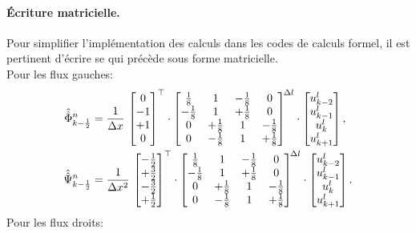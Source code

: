 \paragraph{Écriture matricielle.}
Pour simplifier l'implémentation des calculs dans les codes de calculs formel, il est pertinent d'écrire se qui précède sous forme matricielle.\\
Pour les flux gauches:
\begin{align}
\hat{\hat{\Phi}}_{k-\frac12}^n
&= \frac{1}{\Delta x}\,
\begin{bmatrix}0 \\ -1 \\ +1 \\ 0\end{bmatrix}^\top \cdot
\begin{bmatrix}
\frac{1}{8} & 1 & -\frac{1}{8} & 0\\
-\frac{1}{8} & 1 & +\frac{1}{8} & 0\\
0 & +\frac{1}{8} & 1 & -\frac{1}{8}\\
0 & -\frac{1}{8} & 1 & +\frac{1}{8}
\end{bmatrix}^{\!\Delta l} \cdot
\begin{bmatrix}
u^l_{k-2}\\ u^l_{k-1}\\ u^l_{k}\\ u^l_{k+1}
\end{bmatrix},\\
\hat{\hat{\Psi}}_{k-\frac12}^n
&= \frac{1}{\Delta x^2}\,
\begin{bmatrix}-\tfrac12 \\ +\tfrac32 \\ -\tfrac32 \\ +\tfrac12\end{bmatrix}^\top \cdot
\begin{bmatrix}
\frac{1}{8} & 1 & -\frac{1}{8} & 0\\
-\frac{1}{8} & 1 & +\frac{1}{8} & 0\\
0 & +\frac{1}{8} & 1 & -\frac{1}{8}\\
0 & -\frac{1}{8} & 1 & +\frac{1}{8}
\end{bmatrix}^{\!\Delta l} \cdot
\begin{bmatrix}
u^l_{k-2}\\ u^l_{k-1}\\ u^l_{k}\\ u^l_{k+1}
\end{bmatrix}.
\end{align}
Pour les flux droits:
